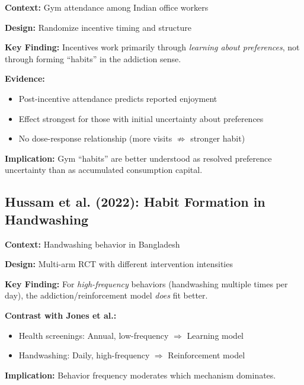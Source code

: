 \documentclass[11pt, a4paper]{article}
\begin{document}
\begin{tcolorbox}[colback=gray!5!white, colframe=gray!75!black,
    title=Banerjee et al. (2021): Exercise Habits and Incentives]

\textbf{Context:} Gym attendance among Indian office workers

\textbf{Design:} Randomize incentive timing and structure

\textbf{Key Finding:} Incentives work primarily through \textit{learning about preferences}, not through forming ``habits'' in the addiction sense.

\textbf{Evidence:}
\begin{itemize}[nosep]
    \item Post-incentive attendance predicts reported enjoyment
    \item Effect strongest for those with initial uncertainty about preferences
    \item No dose-response relationship (more visits $\not\Rightarrow$ stronger habit)
\end{itemize}

\textbf{Implication:} Gym ``habits'' are better understood as resolved preference uncertainty than as accumulated consumption capital.

\end{tcolorbox}

\subsection{Hussam et al. (2022): Habit Formation in Handwashing}

\begin{tcolorbox}[colback=gray!5!white, colframe=gray!75!black,
    title=Hussam et al. (2022): Targeting High Frequency Behaviors]

\textbf{Context:} Handwashing behavior in Bangladesh

\textbf{Design:} Multi-arm RCT with different intervention intensities

\textbf{Key Finding:} For \textit{high-frequency} behaviors (handwashing multiple times per day), the addiction/reinforcement model \textit{does} fit better.

\textbf{Contrast with Jones et al.:}
\begin{itemize}[nosep]
    \item Health screenings: Annual, low-frequency $\Rightarrow$ Learning model
    \item Handwashing: Daily, high-frequency $\Rightarrow$ Reinforcement model
\end{itemize}

\textbf{Implication:} Behavior frequency moderates which mechanism dominates.

\end{tcolorbox}
\end{document}
